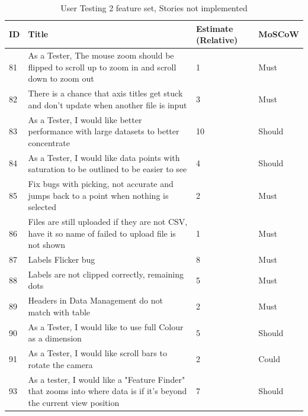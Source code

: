 \begin{table}[hbt!]
    \begin{tabularx}{\textwidth}{ | X | X | X | X | }
        \hline
        ID & Title                                                                                                               & Estimate (Relative) & MoSCoW \\
        \hline
        81 & As a Tester, The mouse zoom should be flipped to scroll up to zoom in and scroll down to zoom out                   & 1                   & Must   \\
        \hline
        82 & There is a chance that axis titles get stuck and don't update when another file is input                            & 3                   & Must   \\
        \hline
        83 & As a Tester, I would like better performance with large datasets to better concentrate                              & 10                  & Should \\
        \hline
        84 & As a Tester, I would like data points with saturation to be outlined to be easier to see                            & 4                   & Should \\
        \hline
        85 & Fix bugs with picking, not accurate and jumps back to a point when nothing is selected                              & 2                   & Must   \\
        \hline
        86 & Files are still uploaded if they are not CSV, have it so name of failed to upload file is not shown                 & 1                   & Must   \\
        \hline
        87 & Labels Flicker bug                                                                                                  & 8                   & Must   \\
        \hline
        88 & Labels are not clipped correctly, remaining dots                                                                    & 5                   & Must   \\
        \hline
        89 & Headers in Data Management do not match with table                                                                  & 2                   & Must   \\
        \hline
        90 & As a Tester, I would like to use full Colour as a dimension                                                         & 5                   & Should \\
        \hline
        91 & As a Tester, I would like scroll bars to rotate the camera                                                          & 2                   & Could  \\
        \hline
        93 & As a tester, I would like a "Feature Finder" that zooms into where data is if it's beyond the current view position & 7                   & Should \\
        \hline
    \end{tabularx}
    \caption{User Testing 2 feature set, Stories not implemented}
    \label{UT2}
\end{table}

